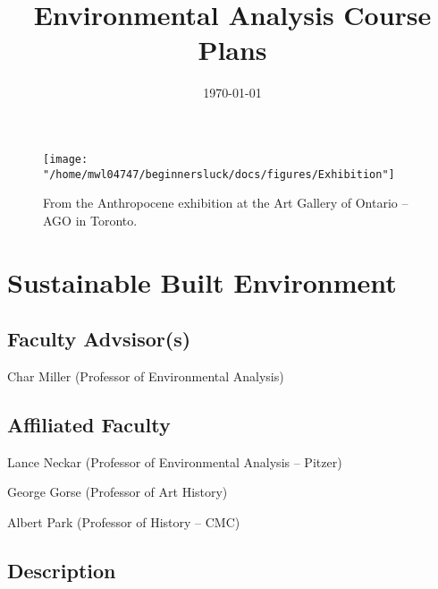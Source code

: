\documentclass{article}\usepackage[]{graphicx}\usepackage[]{xcolor}
\title{Environmental Analysis Course Plans}
\date{\today}
\newenvironment{itemize*}%
  {\begin{itemize}%
    \setlength{\itemsep}{0pt}%
    \setlength{\parskip}{0pt}}%
  {\end{itemize}}
\begin{document}
\begin{titlepage}
\thispagestyle{empty}

\begin{figure}%
\texttt{[image: "/home/mwl04747/beginnersluck/docs/figures/Exhibition"]}
\caption{From the Anthropocene exhibition at the Art Gallery of Ontario – AGO in Toronto.}
\end{figure}


\maketitle
\tableofcontents

\end{titlepage}




\newpage
\section{Sustainable Built Environment}



\subsection{Faculty Advsisor(s)}

\begin{itemize*}
  \item Char Miller (Professor of Environmental Analysis)
\end{itemize*}

\subsection{Affiliated Faculty}

\begin{itemize*}
  \item Lance Neckar (Professor of Environmental Analysis -- Pitzer)
  \item George Gorse (Professor of Art History)
  \item Albert Park (Professor of History -- CMC)
\end{itemize*}

\subsection{Description}
\end{document}
